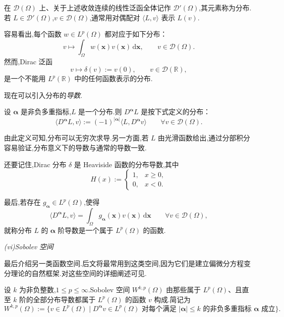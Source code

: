 \begin{definition*}[分布]
在 \(\mathcal D(\Omega)\) 上、关于上述收敛连续的线性泛函全体记作 \(\mathcal D'(\Omega)\),其元素称为{\heiti 分布}.若 \(L\in\mathcal D'(\Omega)\),\(v\in\mathcal D(\Omega)\),通常用对偶配对 \(\langle L,v\rangle\) 表示 \(L(v)\).
\end{definition*}

容易看出,每个函数 \(w\in L^p(\Omega)\) 都对应于如下分布：
\[
  v\longmapsto \int_\Omega w(\boldsymbol{x})v(\boldsymbol{x})\,\mathrm d\boldsymbol{x},
  \qquad v\in\mathcal D(\Omega).
\]
然而,Dirac 泛函
\[
  v\longmapsto \delta(v):=v(0),\qquad v\in\mathcal D(\mathbb R),
\]
是一个不能用 \(L^p(\mathbb R)\) 中的任何函数表示的分布.

现在可以引入分布的\emph{导数}.
\begin{definition*}[分布导数]
设 \(\boldsymbol{\alpha}\) 是非负多重指标,\(L\) 是一个分布.则 \(D^{\boldsymbol{\alpha}}L\) 是按下式定义的分布：
\begin{equation}\label{eq:1.2.9}
  \langle D^{\boldsymbol{\alpha}}L,v\rangle
  :=(-1)^{|\boldsymbol{\alpha}|}\langle L,D^{\boldsymbol{\alpha}}v\rangle
  \qquad \forall v\in\mathcal D(\Omega).
\end{equation}
\end{definition*}
由此定义可知,分布可以无穷次求导.另一方面,若 \(L\) 由光滑函数给出,通过分部积分容易验证,分布意义下的导数与通常的导数一致.

还要记住,Dirac 分布 \(\delta\) 是 Heaviside 函数的分布导数,其中
\[
  H(x):=\begin{cases}
    1,&x\ge 0,\\
    0,&x<0.
  \end{cases}
\]

最后,若存在 \(g_{\boldsymbol{\alpha}}\in L^p(\Omega)\),使得
\begin{equation}\label{eq:1.2.10}
  \langle D^{\boldsymbol{\alpha}}L,v\rangle
  =\int_\Omega g_{\boldsymbol{\alpha}}(\boldsymbol{x})v(\boldsymbol{x})\,\mathrm d\boldsymbol{x}
  \qquad \forall v\in\mathcal D(\Omega),
\end{equation}
就称分布 \(L\) 的 \(\boldsymbol{\alpha}\) 阶导数是一个属于 \(L^p(\Omega)\) 的函数.

\medskip
\noindent\textit{(vi)Sobolev 空间}

最后介绍另一类函数空间.后文将最常用到这类空间,因为它们是建立偏微分方程变分理论的自然框架.对这些空间的详细阐述可见.

\begin{definition*}[Sobolev 空间]
设 \(k\) 为非负整数,\(1\le p\le\infty\).{\heiti Sobolev 空间} \(W^{k,p}(\Omega)\) 由那些属于 \(L^p(\Omega)\)、且直至 \(k\) 阶的全部分布导数都属于 \(L^p(\Omega)\) 的函数 \(v\) 构成.简记为
\begin{equation}\label{eq:1.2.11}
  W^{k,p}(\Omega):=
  \bigl\{v\in L^p(\Omega)\mid
    D^{\boldsymbol{\alpha}}v\in L^p(\Omega)
    \text{ 对每个满足 \(|\boldsymbol{\alpha}|\le k\) 的非负多重指标 \(\boldsymbol{\alpha}\) 成立}
  \bigr\}.
\end{equation}
\end{definition*}

